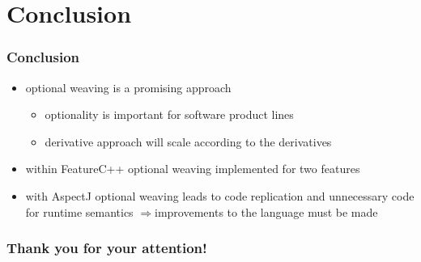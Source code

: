 \documentclass{beamer}
\begin{document}
\section{Conclusion}
\begin{frame}
\frametitle{Conclusion}
\begin{itemize}
 \item optional weaving is a promising approach 
 \begin{itemize}
  \item optionality is important for software product lines
  \item derivative approach will scale according to the derivatives
 \end{itemize}
 \item within FeatureC++ optional weaving implemented for two features 
 \item with AspectJ optional weaving leads to code replication and unnecessary code for runtime semantics
	 $\Rightarrow$improvements to the language must be made  
 
\end{itemize}
\end{frame}




\begin{frame}
 \frametitle{Thank you for your attention!}
\end{frame}
\end{document}
